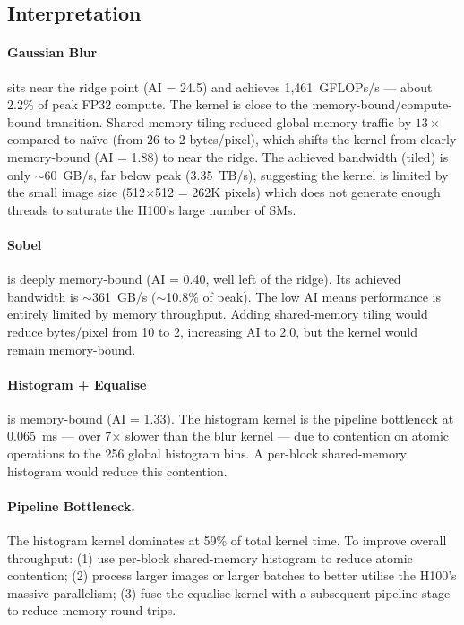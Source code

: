 \documentclass[
hf,
]{confart}
\begin{document}
\subsection{Interpretation}

\paragraph{Gaussian Blur} sits near the ridge point (AI = 24.5) and achieves 1,461~GFLOPs/s — about 2.2\% of peak FP32 compute. The kernel is close to the memory-bound/compute-bound transition. Shared-memory tiling reduced global memory traffic by $13\times$ compared to na\"ive (from 26 to 2 bytes/pixel), which shifts the kernel from clearly memory-bound (AI = 1.88) to near the ridge. The achieved bandwidth (tiled) is only $\sim$60~GB/s, far below peak (3.35~TB/s), suggesting the kernel is limited by the small image size (512$\times$512 = 262K pixels) which does not generate enough threads to saturate the H100's large number of SMs.

\paragraph{Sobel} is deeply memory-bound (AI = 0.40, well left of the ridge). Its achieved bandwidth is $\sim$361~GB/s ($\sim$10.8\% of peak). The low AI means performance is entirely limited by memory throughput. Adding shared-memory tiling would reduce bytes/pixel from 10 to 2, increasing AI to 2.0, but the kernel would remain memory-bound.

\paragraph{Histogram + Equalise} is memory-bound (AI = 1.33). The histogram kernel is the pipeline bottleneck at 0.065~ms — over 7$\times$ slower than the blur kernel — due to contention on atomic operations to the 256 global histogram bins. A per-block shared-memory histogram would reduce this contention.

\paragraph{Pipeline Bottleneck.}
The histogram kernel dominates at 59\% of total kernel time. To improve overall throughput: (1) use per-block shared-memory histogram to reduce atomic contention; (2) process larger images or larger batches to better utilise the H100's massive parallelism; (3) fuse the equalise kernel with a subsequent pipeline stage to reduce memory round-trips.
\end{document}
